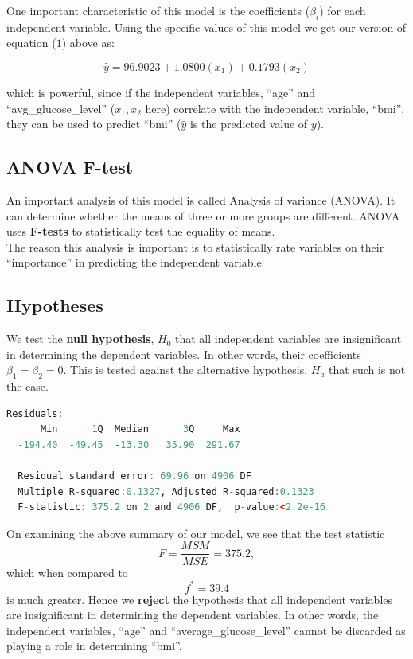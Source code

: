 \documentclass{article}
\begin{document}
One important characteristic of this model is the 
coefficients ($\beta_i$) for each independent variable.
Using the specific values of this model
we get our version of equation ($1$) above
as:

\begin{equation}
  \hat{y} = 96.9023 + 1.0800(x_1) + 0.1793(x_2)
\end{equation}

which is powerful, since if the independent
variables, ``age'' and ``avg\_glucose\_level''
($x_1, x_2$ here) correlate with the independent variable,
``bmi'', they can be used to predict ``bmi'' ($\hat{y}$
is the predicted value of $y$).

\subsection*{ANOVA F-test}
An important analysis of this model is called Analysis of variance (ANOVA).
It can determine whether the means of three or more groups are different. 
ANOVA uses \textbf{F-tests} to statistically test the equality of means.\\

The reason this analysis is important is to statistically rate variables
on their ``importance'' in predicting the independent variable.

\subsection*{Hypotheses}
We test the \textbf{null hypothesis}, $H_0$ that 
all independent variables are insignificant in determining
the dependent variables. In other words, their coefficients 
$\beta_1=\beta_2=0$. This is tested against the alternative
hypothesis, $H_a$ that such is not the case.

\begin{lstlisting}[backgroundcolor = \color{lightgray},language = R]
  Residuals:
      Min      1Q  Median      3Q     Max 
  -194.40  -49.45  -13.30   35.90  291.67 

  Residual standard error: 69.96 on 4906 DF
  Multiple R-squared:0.1327, Adjusted R-squared:0.1323 
  F-statistic: 375.2 on 2 and 4906 DF,  p-value:<2.2e-16
\end{lstlisting}

On examining the above summary of our model, we see
that the test statistic
$$F=\frac{MSM}{MSE}=375.2,$$
which when compared to
$$f^*=39.4$$
is much greater. Hence we \textbf{reject}
the hypothesis that 
all independent variables are insignificant in determining
the dependent variables. In other words, the independent
variables, ``age'' and ``average\_glucose\_level'' cannot be 
discarded as playing a role in determining ``bmi''.
\end{document}
